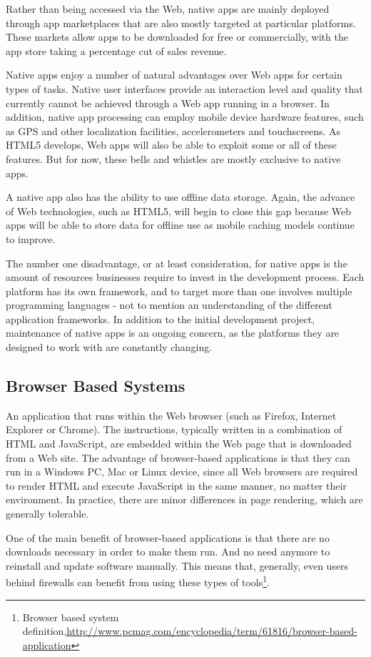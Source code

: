 Rather than being accessed via the Web, native apps are mainly deployed through app marketplaces that are also mostly targeted at particular platforms. These markets allow apps to be downloaded for free or commercially, with the app store taking a percentage cut of sales revenue.

Native apps enjoy a number of natural advantages over Web apps for certain types of tasks. Native user interfaces provide an interaction level and quality that currently cannot be achieved through a Web app running in a browser. In addition, native app processing can employ mobile device hardware features, such as GPS and other localization facilities, accelerometers and touchscreens. As HTML5 develops, Web apps will also be able to exploit some or all of these features. But for now, these bells and whistles are mostly exclusive to native apps.

A native app also has the ability to use offline data storage. Again, the advance of Web technologies, such as HTML5, will begin to close this gap because Web apps will be able to store data for offline use as mobile caching models continue to improve.

The number one disadvantage, or at least consideration, for native apps is the amount of resources businesses require to invest in the development process. Each platform has its own framework, and to target more than one involves multiple programming languages - not to mention an understanding of the different application frameworks. In addition to the initial development project, maintenance of native apps is an ongoing concern, as the platforms they are designed to work with are constantly changing.

\subsection{Browser Based Systems}
An application that runs within the Web browser (such as Firefox, Internet Explorer or Chrome). The instructions, typically written in a combination of HTML and JavaScript, are embedded within the Web page that is downloaded from a Web site. The advantage of browser-based applications is that they can run in a Windows PC, Mac or Linux device, since all Web browsers are required to render HTML and execute JavaScript in the same manner, no matter their environment. In practice, there are minor differences in page rendering, which are generally tolerable. 

One of the main benefit of browser-based applications is that there are no downloads necessary in order to make them run. And no need anymore to reinstall and update software manually. This means that, generally, even users behind firewalls can benefit from using these types of tools\footnote{Browser based system definition,\url{http://www.pcmag.com/encyclopedia/term/61816/browser-based-application}}.

